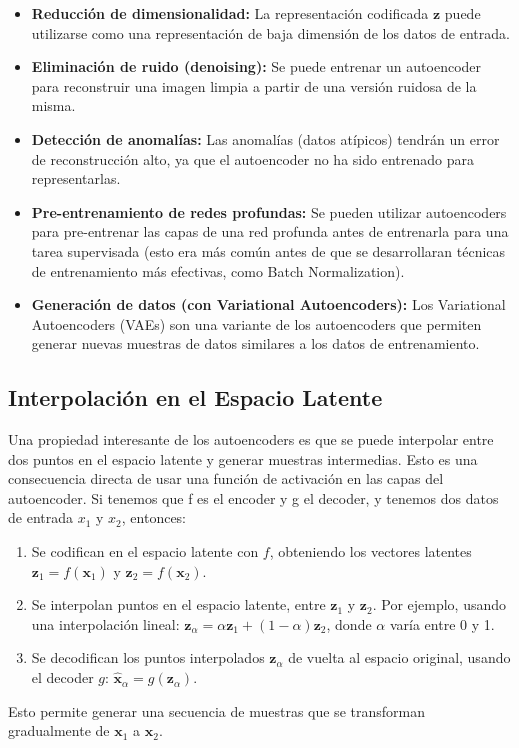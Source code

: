 \documentclass{article}
\begin{document}
\begin{itemize}
    \item \textbf{Reducción de dimensionalidad:}  La representación codificada \(\mathbf{z}\) puede utilizarse como una representación de baja dimensión de los datos de entrada.
    \item \textbf{Eliminación de ruido (denoising):}  Se puede entrenar un autoencoder para reconstruir una imagen limpia a partir de una versión ruidosa de la misma.
    \item \textbf{Detección de anomalías:}  Las anomalías (datos atípicos) tendrán un error de reconstrucción alto, ya que el autoencoder no ha sido entrenado para representarlas.
    \item \textbf{Pre-entrenamiento de redes profundas:}  Se pueden utilizar autoencoders para pre-entrenar las capas de una red profunda antes de entrenarla para una tarea supervisada (esto era más común antes de que se desarrollaran técnicas de entrenamiento más efectivas, como Batch Normalization).
    \item \textbf{Generación de datos (con Variational Autoencoders):}  Los Variational Autoencoders (VAEs) son una variante de los autoencoders que permiten generar nuevas muestras de datos similares a los datos de entrenamiento.
\end{itemize}

\subsection{Interpolación en el Espacio Latente}
Una propiedad interesante de los autoencoders es que se puede interpolar entre dos puntos en el espacio latente y generar muestras intermedias. Esto es una consecuencia directa de usar una función de activación en las capas del autoencoder. Si tenemos que f es el encoder y g el decoder, y tenemos dos datos de entrada  \(x_1\) y  \(x_2\), entonces:

\begin{enumerate}
  \item Se codifican en el espacio latente con \(f\), obteniendo los vectores latentes \(\mathbf{z}_1 = f(\mathbf{x}_1)\) y \(\mathbf{z}_2 = f(\mathbf{x}_2)\).
\item Se interpolan puntos en el espacio latente, entre \(\mathbf{z}_1\) y  \(\mathbf{z}_2\). Por ejemplo, usando una interpolación lineal: \(\mathbf{z}_{\alpha} = \alpha \mathbf{z}_1 + (1-\alpha) \mathbf{z}_2\), donde \(\alpha\) varía entre 0 y 1.
  \item Se decodifican los puntos interpolados \(\mathbf{z}_{\alpha}\) de vuelta al espacio original, usando el decoder \(g\): \(\hat{\mathbf{x}}_\alpha = g(\mathbf{z}_\alpha)\).
\end{enumerate}
Esto permite generar una secuencia de muestras que se transforman gradualmente de \(\mathbf{x}_1\) a \(\mathbf{x}_2\).
\end{document}
